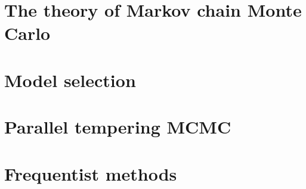 \documentclass [12pt,letter]{article}
\theoremstyle{plain}
\theoremstyle{plain}
\theoremstyle{definition}
\theoremstyle{definition}
\numberwithin{equation}{section}
\begin{document}
\section{The theory of Markov chain Monte Carlo}
\label{sec:mcmc}


\pagebreak

\section{Model selection}
\label{sec:model_selection}



\pagebreak


\section{Parallel tempering MCMC}
\label{sec:parallel_tempering}



\pagebreak

\section{Frequentist methods}
\label{sec:frequentist_methods}



%
%
% 
\end{document}
